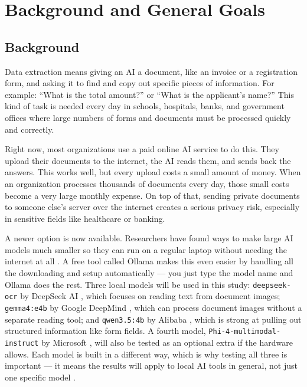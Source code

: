 \section{Background and General Goals}
\label{sec:background}

\subsection{Background}

Data extraction means giving an AI a document, like an invoice or a registration form, and asking it to find and copy out specific pieces of information. For example: ``What is the total amount?'' or ``What is the applicant's name?'' This kind of task is needed every day in schools, hospitals, banks, and government offices where large numbers of forms and documents must be processed quickly and correctly.

Right now, most organizations use a paid online AI service to do this. They upload their documents to the internet, the AI reads them, and sends back the answers. This works well, but every upload costs a small amount of money. When an organization processes thousands of documents every day, those small costs become a very large monthly expense. On top of that, sending private documents to someone else's server over the internet creates a serious privacy risk, especially in sensitive fields like healthcare or banking.

A newer option is now available. Researchers have found ways to make large AI models much smaller so they can run on a regular laptop without needing the internet at all \cite{dettmers2022llmint8, frantar2022gptq}. A free tool called Ollama \cite{ollama_2024} makes this even easier by handling all the downloading and setup automatically --- you just type the model name and Ollama does the rest. Three local models will be used in this study: \texttt{deepseek-ocr} by DeepSeek AI \cite{deepseek_ocr_2024}, which focuses on reading text from document images; \texttt{gemma4:e4b} by Google DeepMind \cite{gemma4_2026}, which can process document images without a separate reading tool; and \texttt{qwen3.5:4b} by Alibaba \cite{qwen3_2025}, which is strong at pulling out structured information like form fields. A fourth model, \texttt{Phi-4-multimodal-instruct} by Microsoft \cite{phi4mini_2025}, will also be tested as an optional extra if the hardware allows. Each model is built in a different way, which is why testing all three is important --- it means the results will apply to local AI tools in general, not just one specific model \cite{gemma4_phi4_qwen3_2026}.

